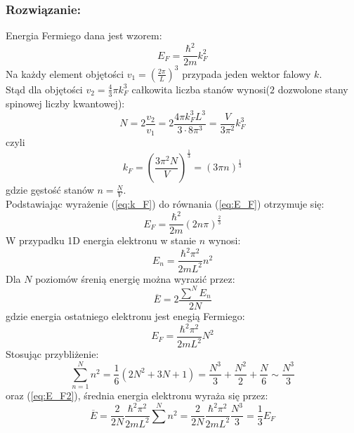 \subsubsection*{Rozwiązanie:}
Energia Fermiego dana jest wzorem:
\begin{equation}
\label{eq:E_F}
E_F = \frac{\hbar^2}{2m}k_F^2
\end{equation}
Na każdy element objętości $v_1 = \left(\frac{2\pi}{L}\right)^3$ przypada jeden wektor falowy $k$.\\
Stąd dla objętości $v_2 = \frac{4}{3}\pi k_F^3$ całkowita liczba stanów wynosi($2$ dozwolone stany spinowej liczby kwantowej):
\begin{equation}
N = 2 \frac{v_2}{v_1} = 2 \frac{4\pi k_F^3 L^3}{3\cdot 8 \pi^3} =  \frac{V}{3\pi^2}k_F^3
\end{equation}
czyli
\begin{equation}
\label{eq:k_F}
k_F = \left( \frac{3 \pi^2 N}{V} \right)^{\frac{1}{3}} =  (3\pi n)^{\frac{1}{3}}
\end{equation} 
gdzie gęstość stanów $n = \frac{N}{V}$.\\
Podstawiając wyrażenie (\ref{eq:k_F}) do równania (\ref{eq:E_F}) otrzymuje się:
\begin{equation}
E_F = \frac{\hbar^2}{2m} (2n\pi)^{\frac{2}{3}}
\end{equation} 
\hrulefill
\newline
W przypadku 1D energia elektronu w stanie $n$ wynosi:
\begin{equation}
E_n = \frac{\hbar^2 \pi^2}{2mL^2}n^2
\end{equation}
Dla  $N$ poziomów śrenią energię można wyrazić przez:
\begin{equation}
\overline{E} = 2 \frac{\sum^N E_n}{2N}
\end{equation}
gdzie energia ostatniego elektronu jest enegią Fermiego:
\begin{equation}
\label{eq:E_F2}
E_F = \frac{\hbar^2 \pi^2}{2mL^2} N^2
\end{equation}
Stosując przybliżenie:
\begin{equation}
\sum^N_{n=1} n^2 = \frac{1}{6}(2N^2 + 3N + 1) = \frac{N^3}{3} + \frac{N^2}{2} + \frac{N}{6} \sim \frac{N^3}{3}
\end{equation} 
oraz (\ref{eq:E_F2}), średnia energia elektronu wyraża się przez:
\begin{equation}
\overline{E} = \frac{2}{2N} \frac{\hbar^2 \pi^2}{2mL^2} \sum^N n^2 = \frac{2}{2N} \frac{\hbar^2 \pi^2}{2mL^2} \frac{N^3}{3} = \frac{1}{3} E_F
\end{equation}



\hrulefill
